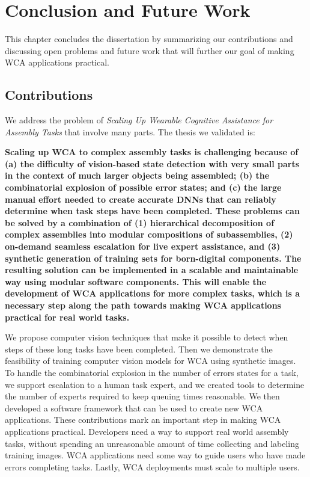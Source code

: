 \chapter{Conclusion and Future Work}\label{chap:conclusion}

This chapter concludes the dissertation by summarizing our contributions and
discussing open problems and future work that will further our goal of making
WCA applications practical.

\section{Contributions}

We address the problem of \textit{Scaling Up Wearable Cognitive Assistance for
  Assembly Tasks} that involve many parts.
The thesis we validated is:

\textbf{
  Scaling up WCA to complex assembly tasks is challenging because of
  (a) the difficulty of
  vision-based state detection with very small parts in the context of much
  larger objects being assembled; (b) the combinatorial explosion
  of possible error states; and (c) the large manual effort needed to create
  accurate DNNs that can reliably determine when task steps have been completed.
  These problems can be solved by a combination of (1) hierarchical
  decomposition of
  complex assemblies into modular compositions of subassemblies, (2) on-demand
  seamless
  escalation for live expert assistance, and (3) synthetic generation of
  training
  sets for born-digital components. The resulting solution can be implemented in
  a scalable and maintainable way using modular software components.
  This will enable the development of WCA applications for more complex tasks,
  which is a necessary step along the path towards making WCA applications
  practical for real world tasks.
}

We propose computer vision techniques that make it possible to detect when steps
of these long tasks have been completed.
Then we demonstrate the feasibility of training computer vision models for WCA
using synthetic images.
To handle the combinatorial explosion in the number of errors states for a task,
we support escalation to a human task expert, and we created tools to determine
the number of experts required to keep queuing times reasonable.
We then developed a software framework that can be used to create new WCA
applications.
These contributions mark an important step in making WCA applications practical.
Developers need a way to support real world assembly tasks, without spending an
unreasonable amount of time collecting and labeling training images.
WCA applications need some way to guide users who have made errors completing
tasks.
Lastly, WCA deployments must scale to multiple users.

